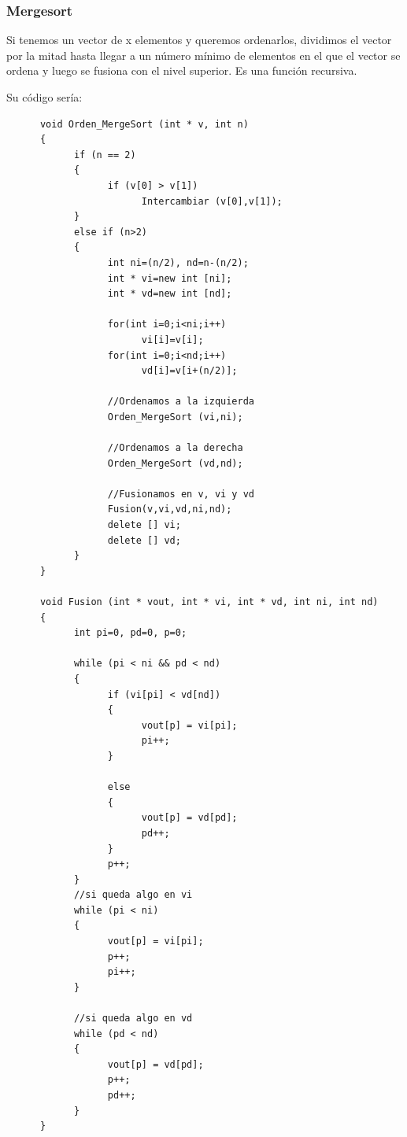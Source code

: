 \documentclass[10pt,a4paper,spanish]{report}
\begin{document}
                  \subsubsection{\textcolor[rgb]{0.5,0.8,0.1}Mergesort}
                  \noindent
                        Si tenemos un vector de x elementos y queremos ordenarlos, dividimos el vector por la mitad hasta llegar a un número mínimo de elementos en el que el vector se ordena y luego se fusiona con el nivel superior. Es una función recursiva.

                        \noindent
                        Su código sería:
      \begin{verbatim}
      void Orden_MergeSort (int * v, int n)
      {
            if (n == 2)
            {
                  if (v[0] > v[1])
                        Intercambiar (v[0],v[1]);
            }
            else if (n>2)
            {
                  int ni=(n/2), nd=n-(n/2);
                  int * vi=new int [ni];
                  int * vd=new int [nd];

                  for(int i=0;i<ni;i++)
                        vi[i]=v[i];
                  for(int i=0;i<nd;i++)
                        vd[i]=v[i+(n/2)];

                  //Ordenamos a la izquierda
                  Orden_MergeSort (vi,ni);

                  //Ordenamos a la derecha
                  Orden_MergeSort (vd,nd);

                  //Fusionamos en v, vi y vd
                  Fusion(v,vi,vd,ni,nd);
                  delete [] vi;
                  delete [] vd;
            }
      }

      void Fusion (int * vout, int * vi, int * vd, int ni, int nd)
      {
            int pi=0, pd=0, p=0;

            while (pi < ni && pd < nd)
            {
                  if (vi[pi] < vd[nd])
                  {
                        vout[p] = vi[pi];
                        pi++;
                  }

                  else
                  {
                        vout[p] = vd[pd];
                        pd++;
                  }
                  p++;
            }
            //si queda algo en vi
            while (pi < ni)
            {
                  vout[p] = vi[pi];
                  p++;
                  pi++;
            }

            //si queda algo en vd
            while (pd < nd)
            {
                  vout[p] = vd[pd];
                  p++;
                  pd++;
            }
      }
      \end{verbatim}
\end{document}
